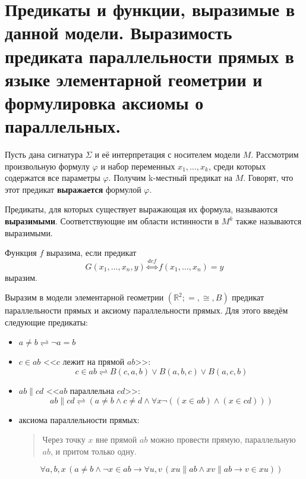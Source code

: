 \section[Предикаты и функции, выразимые в данной модели. Выразимость предиката параллельности прямых в языке
элементарной геометрии и формулировка аксиомы о параллельных.]{\sloppy Предикаты и функции, выразимые в данной
модели. Выразимость предиката параллельности прямых в языке элементарной геометрии и формулировка аксиомы о
параллельных.}
\begin{definition}
	Пусть дана сигнатура $\Sigma$ и её интерпретация с носителем модели $M$. Рассмотрим произвольную формулу
	$\varphi$ и набор переменных $x_1,\ldots,x_k$, среди которых содержатся все параметры $\varphi$. Получим k-местный
	предикат на $M$. Говорят, что этот предикат \textbf{выражается} формулой $\varphi$.

	Предикаты, для которых существует выражающая их формула, называются \textbf{выразимыми}. Соответствующие им
	области истинности в $M^k$ также называются выразимыми.
\end{definition}
\begin{definition}
	Функция $f$ выразима, если предикат $$G(x_1,\ldots,x_n,y) \stackrel{def}{\Longleftrightarrow} f(x_1,\ldots,x_n)
	= y$$ выразим.
\end{definition}
\begin{example}
	Выразим в модели элементарной геометрии $(\mathbb{R}^2;=,\cong,B)$ предикат параллельности прямых и аксиому
	параллельности прямых. Для этого введём следующие предикаты:
	\begin{itemize}
		\item $a \ne b \rightleftharpoons \neg a=b$
		\item $c \in ab$ <<$c$ лежит на прямой $ab$>>: $$c\in ab \rightleftharpoons B(c,a,b)\vee B(a,b,c)\vee
			B(a,c,b)$$
		\item $ab\parallel cd$ <<$ab$ параллельна $cd$>>: $$ab\parallel cd\rightleftharpoons (a \ne b\wedge c \ne
			d\wedge \forall x\neg ((x\in ab)\wedge (x\in cd)))$$
		\item аксиома параллельности прямых:
			\begin{quote}
				Через точку $x$ вне прямой $ab$ можно провести прямую, параллельную $ab$, и притом только одну.
			\end{quote}
			$$\forall a,b,x\,(a\ne b \wedge\neg x\in ab \to \forall u,v\,(xu\parallel ab \wedge xv\parallel ab\to
			v\in xu))$$
	\end{itemize}
\end{example}
